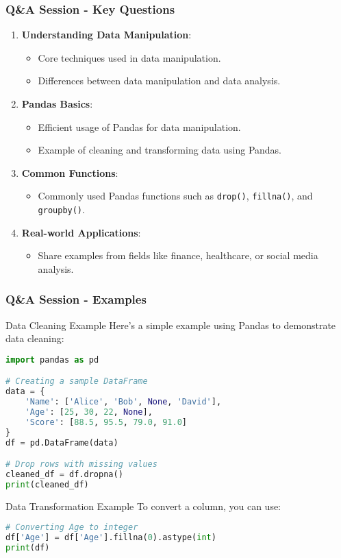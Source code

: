 \documentclass[aspectratio=169]{beamer}
\begin{document}
\begin{frame}[fragile]
  \frametitle{Q\&A Session - Key Questions}
  \begin{enumerate}
      \item \textbf{Understanding Data Manipulation}:
          \begin{itemize}
              \item Core techniques used in data manipulation.
              \item Differences between data manipulation and data analysis.
          \end{itemize}
      \item \textbf{Pandas Basics}:
          \begin{itemize}
              \item Efficient usage of Pandas for data manipulation.
              \item Example of cleaning and transforming data using Pandas.
          \end{itemize}
      \item \textbf{Common Functions}:
          \begin{itemize}
              \item Commonly used Pandas functions such as \texttt{drop()}, \texttt{fillna()}, and \texttt{groupby()}.
          \end{itemize}
      \item \textbf{Real-world Applications}:
          \begin{itemize}
              \item Share examples from fields like finance, healthcare, or social media analysis.
          \end{itemize}
  \end{enumerate}
\end{frame}

\begin{frame}[fragile]
  \frametitle{Q\&A Session - Examples}
  \begin{block}{Data Cleaning Example}
      Here’s a simple example using Pandas to demonstrate data cleaning:
      \begin{lstlisting}[language=Python]
import pandas as pd

# Creating a sample DataFrame
data = {
    'Name': ['Alice', 'Bob', None, 'David'],
    'Age': [25, 30, 22, None],
    'Score': [88.5, 95.5, 79.0, 91.0]
}
df = pd.DataFrame(data)

# Drop rows with missing values
cleaned_df = df.dropna()
print(cleaned_df)
      \end{lstlisting}
  \end{block}
  
  \begin{block}{Data Transformation Example}
      To convert a column, you can use:
      \begin{lstlisting}[language=Python]
# Converting Age to integer
df['Age'] = df['Age'].fillna(0).astype(int)
print(df)
      \end{lstlisting}
  \end{block}
\end{frame}
\end{document}
